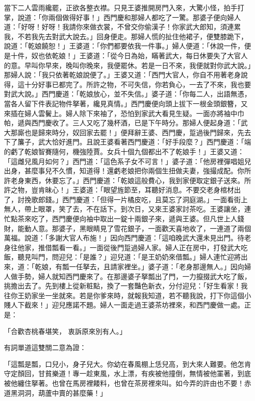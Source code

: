 當下二人雲雨纔罷，正欲各整衣襟。只見王婆推開房門入來，大驚小怪，拍手打掌，說道：「你兩個做得好事！」西門慶和那婦人都吃了一驚。那婆子便向婦人道：「好呀！好呀！我請你來做衣裳，不曾交你偷漢子！你家武大郎知，須連累我，不若我先去對武大說去。」回身便走。那婦人慌的扯住他裙子，便雙膝跪下，說道：「乾娘饒恕！」王婆道：「你們都要依我一件事。」婦人便道：「休說一件，便是十件，奴也依乾娘！」王婆道：「從今日為始，瞞著武大，每日休要失了大官人的意。早叫你早來，晚叫你晚來，我便罷休。若是一日不來，我便就對你武大說。」那婦人說：「我只依著乾娘說便了。」王婆又道：「西門大官人，你自不用著老身說得，這十分好事已都完了。所許之物，不可失信，你若負心，一去了不來，我也要對武大說。」西門慶道：「乾娘放心，並不失信。」婆子道：「你每二人，出語無憑，當各人留下件表記物件拏著，纔見真情。」西門慶便向頭上拔下一根金頭銀簪，又來插在婦人雲鬢上。婦人除下來袖了，恐怕到家武大看見生疑。一面亦將袖中巾帕，遞與西門慶收了。三人又吃了幾杯酒，已是下午時分。那婦人便起身道：「武大那廝也是歸來時分，奴回家去罷！」便拜辭王婆、西門慶，踅過後門歸來，先去下了簾子，武大恰好進門。且說王婆看著西門慶道：「好手段麼？」西門慶道：「端的虧了乾娘智賽隨何，機強陸賈。女兵十個九個都出不了乾娘手！」王婆又道：「這雌兒風月如何？」西門道：「這色系子女不可言！」婆子道：「他房裡彈唱姐兒出身，甚麼事兒不久慣，知道得！還虧老娘把你兩個生扭做夫妻，強撮成配。你所許老身東西，休要忘了。」西門慶道：「乾娘這般費心，我到家便取定銀子送來。所許之物，豈肯昧心！」王婆道：「眼望旌節至，耳聽好消息。不要交老身棺材出了，討挽歌郎錢。」西門慶道：「但得一片橘皮吃，且莫忘了洞庭湖。」一面看街上無人，帶上眼罩，笑了去，不在話下。到次日，又來王婆家討茶吃。王婆讓坐，連忙點茶來吃了，西門慶便向袖中取出一錠十兩銀子來，遞與王婆。但凡世上人錢財，能動人意。那婆子，黑眼睛見了雪花銀子，一面歡天喜地收了，一連道了兩個萬福。說道：「多謝大官人布施！」因向西門慶道：「這咱晚武大還未見出門。待老身往他家，推借瓢看一看。」一面從後門踅過婦人家。婦人正在房中，打發武大吃飯，聽見叫門，問迎兒：「是誰？」迎兒道：「是王奶奶來借瓢。」婦人連忙迎將出來，道：「乾娘，有瓢一任拏去，且請家裡坐。」婆子道：「老身那邊無人。」因向婦人做手勢，婦人就知西門慶來了。在那邊婆子拏瓢出了門，一力攛掇武大吃了飯，挑擔出去了。先到樓上從新粧點，換了一套豔色新衣，分付迎兒：「好生看家！我往你王奶家坐一坐就來。若是你爹來時，就報我知道，若不聽我說，打下你這個小賤人下截來！」迎兒應諾不題。婦人一面走過王婆茶坊裡來，和西門慶做一處。正是：

「合歡杏桃春堪笑，  衷訴原來別有人。」

有詞單道這雙關二意為證：

「這瓢是瓢，口兒小，身子兒大。你幼在春風棚上恁兒高，到大來人難要。他怎肯守定顏回，甘貧樂道！專一趁東風，水上漂，有疾被他撞倒，無情被他罣著，到底被他纏住拏著。也曾在馬房裡餧料，也曾在茶房裡來叫。如今弄的許由也不要！赤道黑洞洞，葫蘆中賣的甚麼藥！」

